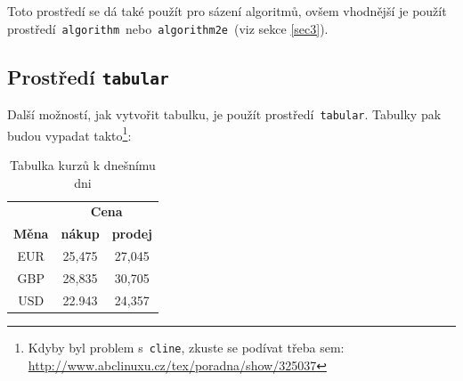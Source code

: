 \documentclass[11pt]{article}
\begin{document}
        \noindent
        Toto prostředí se dá také použít pro sázení algoritmů, ovšem vhodnější je použít prostředí \,\texttt{algorithm} \,nebo \,\texttt{algorithm2e} \,(viz sekce \ref{sec3}).
        
        \subsection{Prostředí \texttt{tabular}}
        Další možností, jak vytvořit tabulku, je použít prostředí \,\texttt{tabular}. Tabulky pak budou vypadat takto\footnote{Kdyby byl problem s \,\texttt{cline}, zkuste se podívat třeba sem: \href{http://www.abclinuxu.cz/tex/poradna/show/325037}{http://www.abclinuxu.cz/tex/poradna/show/325037}}:
        
            \shorthandoff{-}
            \begin{table}[hb]
                \centering
                    \begin{tabular}{|c|c|c|}
                        \hline
                        & \multicolumn{2}{|c|}{\textbf{Cena}} \\
                        \cline{2-3}
                        \textbf{Měna} & \textbf{nákup} & \textbf{prodej} \\ \hline
                        EUR & 25,475 & 27,045 \\
                        GBP & 28,835 & 30,705 \\
                        USD & 22.943 & 24,357 \\ \hline
                    \end{tabular}
                \caption{Tabulka kurzů k dnešnímu dni}
                \label{tab1}
            \end{table}
            
\end{document}
